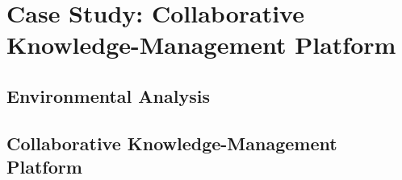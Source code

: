 \chapter{Case Study: Collaborative Knowledge-Management Platform}

\section{Environmental Analysis}

\section{Collaborative Knowledge-Management Platform}
